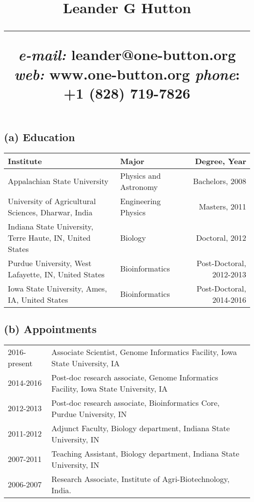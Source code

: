 \documentclass[svgnames,11pt]{article}
\title{%
        \vspace{-2\baselineskip}
            \normalsize
            {\textbf{Leander G Hutton }}\\
            \vspace{0.5\baselineskip}
            \hrule
            \vspace{0.5\baselineskip}
            \textit{e-mail:} leander@one-button.org 
            \textit{web:} www.one-button.org
            \textit{phone}: +1 (828) 719-7826
        \vspace{-1.5ex}
}
\date{}
\begin{document}
\maketitle
\vspace{-4\baselineskip}
\subsection*{(a) Education}
\begin{table}[H]
\centering
\begin{tabular}{llr}
\hline
Institute                                                & Major          & Degree, Year            \\ \hline
Appalachian State University                             & Physics and Astronomy    & Bachelors, 2008       \\
University of Agricultural Sciences, Dharwar, India      & Engineering Physics  & Masters, 2011       \\
Indiana State University, Terre Haute, IN, United States & Biology        & Doctoral, 2012              \\
Purdue University, West Lafayette, IN, United States     & Bioinformatics & Post-Doctoral, 2012-2013 \\
Iowa State University, Ames, IA, United States           & Bioinformatics & Post-Doctoral, 2014-2016 \\ \hline
\end{tabular}
\end{table}

\subsection*{(b) Appointments}
\begin{table}[H]
\centering
\begin{tabular}{ll}
2016-present & Associate Scientist, Genome Informatics Facility, Iowa State University, IA         \\
2014-2016   & Post-doc research associate, Genome Informatics Facility, Iowa State University, IA \\
2012-2013   & Post-doc research associate, Bioinformatics Core, Purdue University, IN             \\
2011-2012   & Adjunct Faculty, Biology department, Indiana State University, IN                   \\
2007-2011   & Teaching Assistant, Biology department, Indiana State University, IN                \\
2006-2007   & Research Associate, Institute of Agri-Biotechnology, India.                        
\end{tabular}
\end{table}
\end{document}
